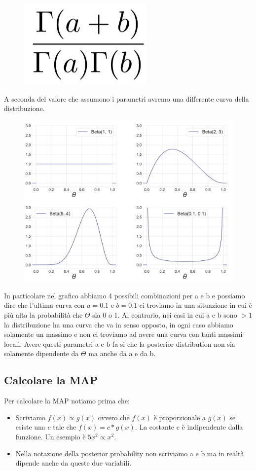 \documentclass[14pt]{extreport}
\begin{document}
\begin{figure}[H]
	\centering
	\includegraphics[width=0.17\linewidth]{35.jpeg}
\end{figure}

A seconda del valore che assumono i parametri avremo una differente curva della distribuzione.
\begin{figure}[H]
	\centering
	\includegraphics[width=0.7\linewidth]{36.jpeg}
\end{figure}

In particolare nel grafico abbiamo 4 possibili combinazioni per a e b e possiamo dire che l'ultima curva con $a=0.1$ e $b=0.1$ ci troviamo in una
situazione in cui è più alta la probabilità che $\Theta$ sia 0 o 1. Al contrario, nei casi in cui a e b sono $> 1$ la distribuzione ha una curva che
va in senso opposto, in ogni caso abbiamo solamente un massimo e non ci troviamo ad avere una curva con tanti massimi locali. Avere questi parametri a
e b fa si che la posterior distribution non sia solamente dipendente da $\Theta$ ma anche da a e da b.

\subsection{Calcolare la MAP}


Per calcolare la MAP notiamo prima che:
\begin{itemize}


	\item Scriviamo $f(x) \propto g(x)$ ovvero che $f(x)$ è proporzionale a $g(x)$ se esiste una $c$ tale che $f(x) = c*g(x)$. La costante c è
	      indipendente dalla funzione. Un esempio è $5x^2 \propto x^2$.
	\item Nella notazione della posterior probability non scriviamo a e b ma in realtà dipende anche da queste due variabili.
\end{itemize}
\end{document}
